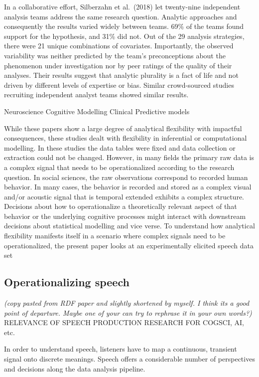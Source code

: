 \documentclass[
  english,
  man]{apa6}
\begin{document}
In a collaborative effort, Silberzahn et al.~(2018) let twenty-nine independent analysis teams address the same research question. Analytic approaches and consequently the results varied widely between teams. 69\% of the teams found support for the hypothesis, and 31\% did not. Out of the 29 analysis strategies, there were 21 unique combinations of covariates. Importantly, the observed variability was neither predicted by the team's preconceptions about the phenomenon under investigation nor by peer ratings of the quality of their analyses.
Their results suggest that analytic plurality is a fact of life and not driven by different levels of expertise or bias. Similar crowd-sourced studies recruiting independent analyst teams showed similar results.

Neuroscience
Cognitive Modelling
Clinical
Predictive models

While these papers show a large degree of analytical flexibility with impactful consequences, these studies dealt with flexibility in inferential or computational modelling. In these studies the data tables were fixed and data collection or extraction could not be changed. However, in many fields the primary raw data is a complex signal that needs to be operationalized according to the research question. In social sciences, the raw observations correspond to recorded human behavior. In many cases, the behavior is recorded and stored as a complex visual and/or acoustic signal that is temporal extended exhibits a complex structure. Decisions about how to operationalize a theoretically relevant aspect of that behavior or the underlying cognitive processes might interact with downstream decisions about statistical modelling and vice verse. To understand how analytical flexibility manifests itself in a scenario where complex signals need to be operationalized, the present paper looks at an experimentally elicited speech data set

\hypertarget{operationalizing-speech}{%
\subsection{Operationalizing speech}\label{operationalizing-speech}}

\emph{(copy pasted from RDF paper and slightly shortened by myself. I think its a good point of departure. Maybe one of your can try to rephrase it in your own words?)}
RELEVANCE OF SPEECH PRODUCTION RESEARCH FOR COGSCI, AI, etc.

In order to understand speech, listeners have to map a continuous, transient signal onto discrete meanings. Speech offers a considerable number of perspectives and decisions along the data analysis pipeline.
\end{document}
